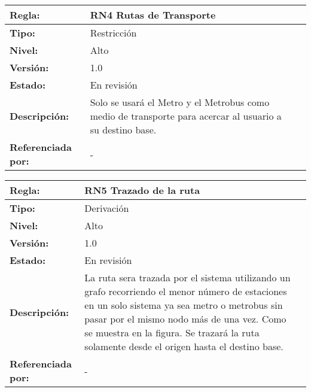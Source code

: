  \begin{table}[h]
    \begin{tabular}{|p{3.5cm}|p{10cm}|l|}
     \hline
     \textbf{Regla: } & RN4 Rutas de Transporte\\ \hline
     \textbf{Tipo: } & Restricci\'on \\ \hline
     \textbf{Nivel:} & Alto \\ \hline
     \textbf{Versi\'on: } & 1.0 \\ \hline
     \textbf{Estado: } & En revisi\'on \\ \hline
     \textbf{Descripci\'on: } & Solo se usar\'a el Metro y el Metrobus como medio de transporte para
     acercar al usuario a su destino base. \\ \hline
     \textbf{Referenciada por: } & - \\
     \hline
   \end{tabular}
  \end{table} 
\begin{table}[h]
    \begin{tabular}{|p{3.5cm}|p{10cm}|l|}
     \hline
     \textbf{Regla: } & RN5 Trazado de la ruta\\ \hline
     \textbf{Tipo: } &  Derivaci\'on\\ \hline
     \textbf{Nivel:} & Alto \\ \hline
     \textbf{Versi\'on: } & 1.0 \\ \hline
     \textbf{Estado: } & En revisi\'on \\ \hline
     \textbf{Descripci\'on: } & La ruta sera trazada por el sistema utilizando un 
     grafo recorriendo el menor n\'umero de estaciones en un solo sistema ya sea metro o 
     metrobus sin pasar por el mismo nodo m\'as de una vez. Como se muestra en la figura. 
     Se trazar\'a la ruta solamente desde el origen  hasta el destino base.\\ \hline 
     \textbf{Referenciada por: } & - \\
     \hline
   \end{tabular}
\end{table}

